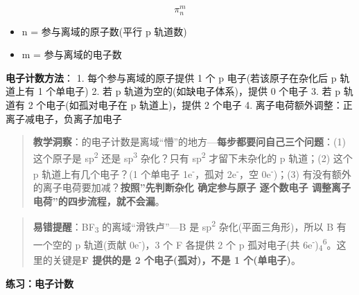\[
\pi_n^m
\]

\begin{itemize}
\tightlist
\item
  n = 参与离域的原子数(平行 p 轨道数)
\item
  m = 参与离域的电子数
\end{itemize}

\textbf{电子计数方法}：
1. 每个参与离域的原子提供 1 个 p 电子(若该原子在杂化后 p 轨道上有 1 个单电子)
2. 若 p 轨道为空的(如缺电子体系)，提供 0 个电子
3. 若 p 轨道有 2 个电子(如孤对电子在 p 轨道上)，提供 2 个电子
4. 离子电荷额外调整：正离子减电子，负离子加电子

\begin{quote}
\textbf{教学洞察}： 的电子计数是离域``懵''的地方---\textbf{每步都要问自己三个问题}：(1) 这个原子是 sp\textsuperscript{2} 还是 sp\textsuperscript{3} 杂化？只有 sp\textsuperscript{2} 才留下未杂化的 p 轨道；(2) 这个 p 轨道上有几个电子？(1 个单电子 \箭 1e\textsuperscript{-}，孤对 \箭 2e\textsuperscript{-}，空 \箭 0e\textsuperscript{-})；(3) 有没有额外的离子电荷要加减？\textbf{按照''先判断杂化 \箭 确定参与原子 \箭 逐个数电子 \箭 调整离子电荷''的四步流程，就不会漏}。
\end{quote}

\begin{quote}
\textbf{易错提醒}：BF\textsubscript{3} 的离域``滑铁卢''---B 是 sp\textsuperscript{2} 杂化(平面三角形)，所以 B 有一个空的 p 轨道(贡献 0e\textsuperscript{-})，3 个 F 各提供 2 个 p 孤对电子(共 6e\textsuperscript{-})\箭 \派\textsubscript{4}\textsuperscript{6}。这里的关键是\textbf{F 提供的是 2 个电子(孤对)，不是 1 个(单电子)}。
\end{quote}

\textbf{练习： 电子计数}

